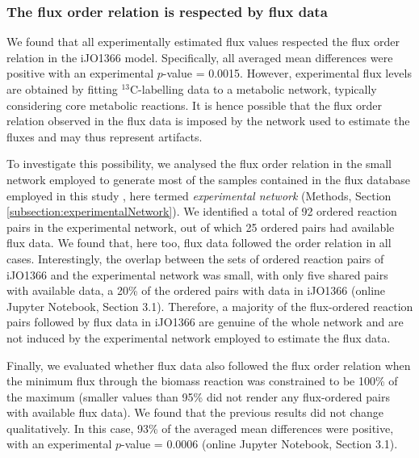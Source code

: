 \documentclass[12pt]{article}
\begin{document}
\subsubsection{The flux order relation is respected by flux data}
We found that all experimentally estimated flux values respected the flux order relation in the iJO1366 model. Specifically, all averaged mean differences were positive with an experimental $p$-value = 0.0015. However, experimental flux levels are obtained by fitting ${}^{13}\mathrm{C}$-labelling data to a metabolic network, typically considering core metabolic reactions. It is hence possible that the flux order relation observed in the flux data is imposed by the network used to estimate the fluxes and may thus represent artifacts.

To investigate this possibility, we analysed the flux order relation in the small network employed to generate most of the samples contained in the flux database employed in this study \cite{Ishii2007}, here termed \emph{experimental network} (Methods, Section \ref{subsection:experimentalNetwork}). We identified a total of 92 ordered reaction pairs in the experimental network, out of which 25 ordered pairs had available flux data. We found that, here too, flux data followed the order relation in all cases. Interestingly, the overlap between the sets of ordered reaction pairs of iJO1366 and the experimental network was small, with only five shared pairs with available data, a 20\% of the ordered pairs with data in iJO1366 (online Jupyter Notebook, Section 3.1). Therefore, a majority of the flux-ordered reaction pairs followed by flux data in iJO1366 are genuine of the whole network and are not induced by the experimental network employed to estimate the flux data.

Finally, we evaluated whether flux data also followed the flux order relation when the minimum flux through the biomass reaction was constrained to be 100\% of the maximum (smaller values than 95\% did not render any flux-ordered pairs with available flux data). We found that the previous results did not change qualitatively. In this case, 93\% of the averaged mean differences were positive, with an experimental $p$-value = 0.0006 (online Jupyter Notebook, Section 3.1).
\end{document}
